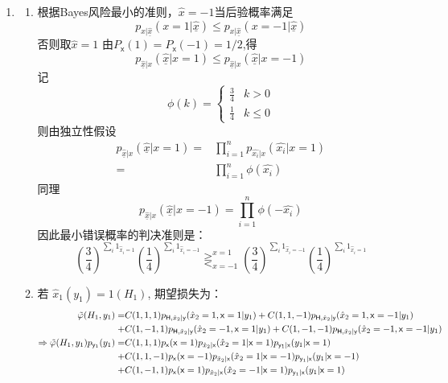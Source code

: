 \documentclass[a4paper]{article}
\begin{document}
\begin{enumerate}[label=\thehwcnt.\arabic*.]
\begin{enumerate}[label=(\alph*)]
  \end{enumerate}  
  \item  
  \begin{enumerate}[label=(\alph*)]
    \item 
    根据Bayes风险最小的准则，$\hat{x}=-1$当后验概率满足
    \[
     p_{x|\underline{\hat{x}}}(x=1| \underline{\hat{x}}) \leq 
     p_{x|\underline{\hat{x}}}(x=-1| \underline{\hat{x}})
    \]
    否则取$\hat{x}=1$
    由$P_{\mathsf{x}}(1)=P_{\mathsf{x}}(-1)=1/2$,得
    \[
     p_{\underline{\hat{x}}|x}(\underline{\hat{x}}|x=1) \leq 
     p_{\underline{\hat{x}}|x}(\underline{\hat{x}}|x=-1)
    \]
    记
    \[
    \phi(k)=\begin{cases}
    \frac{3}{4} & k>0 \\
    \frac{1}{4} & k\leq 0
    \end{cases}
    \]    
    则由独立性假设
    \begin{align*}
    p_{\underline{\hat{x}}|x}(\underline{\hat{x}}|x=1)
    = & \prod_{i=1}^n p_{\hat{x_i}|x}(\hat{x_i}|x=1) \\
    = & \prod_{i=1}^n \phi(\hat{x_i})
    \end{align*}
    同理
    \[
    p_{\underline{\hat{x}}|x}(\underline{\hat{x}}|x=-1)=\prod_{i=1}^{n} \phi(-\hat{x_i})
    \]
    因此最小错误概率的判决准则是：
    $$
    \left(\frac{3}{4}\right)^{\sum_i 1_{\hat{x}_i=1}}\left(\frac{1}{4}\right)^{\sum_i 1_{\hat{x}_i=-1}}\mathop{\gtreqless}_{\hat{x}=-1}^{\hat{x}=1} 
    \left(\frac{3}{4}\right)^{\sum_i 1_{\hat{x}_i=-1}}\left(\frac{1}{4}\right)^{\sum_i 1_{\hat{x}_i=1}}
    $$
    \item 若 $\hat{x}_1(y_1)=1(H_1)$, 期望损失为：
    \begin{align*}
    \tilde{\varphi}(H_1,y_1)=&C(1,1,1)p_{\mathsf{H},\hat{x}_2|\rvy}(\hat{x}_2=1,\rvx=1|y_1)
    +C(1,1,-1)p_{\mathsf{H},\hat{x}_2|\rvy}(\hat{x}_2=1,\rvx=-1|y_1)\\
    +&
    C(1,-1,1)p_{\mathsf{H},\hat{x}_2|\rvy}(\hat{x}_2=-1,\rvx=1|y_1)+
    C(1,-1,-1)p_{\mathsf{H},\hat{x}_2|\rvy}(\hat{x}_2=-1,\rvx=-1|y_1)\\
    \Rightarrow \tilde{\varphi}(H_1,y_1)p_{\rvy_1}(y_1) =& C(1,1,1)p_{\rvx}(\rvx=1)p_{\hat{x}_2|\rvx}(\hat{x}_2=1|\rvx=1)p_{\rvy_1|\rvx}(y_1|\rvx=1)\\
    +&C(1,1,-1)p_{\rvx}(\rvx=-1)p_{\hat{x}_2|\rvx}(\hat{x}_2=1|\rvx=-1)p_{\rvy_1|\rvx}(y_1|\rvx=-1)\\
    +&C(1,-1,1)p_{\rvx}(\rvx=1)p_{\hat{x}_2|\rvx}(\hat{x}_2=-1|\rvx=1)p_{\rvy_1|\rvx}(y_1|\rvx=1)\\

\end{align*}
\end{enumerate}
\end{enumerate}
\end{document}
